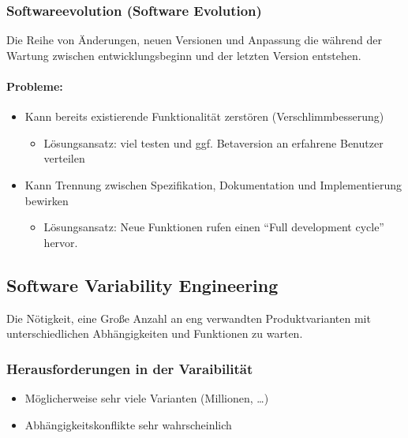 \documentclass[ngerman,color=3b]{tuda_summary}
\begin{document}
\subsubsection{Softwareevolution (Software Evolution)}
\begin{definition}[Softwareevolution]
    Die Reihe von Änderungen, neuen Versionen und Anpassung die während der Wartung zwischen entwicklungsbeginn und der letzten Version entstehen.
\end{definition}
\paragraph{Probleme:}\begin{itemize}
    \item Kann bereits existierende Funktionalität zerstören (Verschlimmbesserung)\begin{itemize}
              \item Lösungsansatz: viel testen und ggf. Betaversion an erfahrene Benutzer verteilen
          \end{itemize}
    \item Kann Trennung zwischen Spezifikation, Dokumentation und Implementierung bewirken\begin{itemize}
              \item Lösungsansatz: Neue Funktionen rufen einen \enquote{Full development cycle} hervor.
          \end{itemize}
\end{itemize}
\subsection{Software Variability Engineering}
\begin{definition}
    Die Nötigkeit, eine Große Anzahl an eng verwandten Produktvarianten mit unterschiedlichen Abhängigkeiten und Funktionen zu warten.
\end{definition}

\subsubsection{Herausforderungen in der Varaibilität}\begin{itemize}
    \item Möglicherweise sehr viele Varianten (Millionen, \dots)
    \item Abhängigkeitskonflikte sehr wahrscheinlich
\end{itemize}
\end{document}
